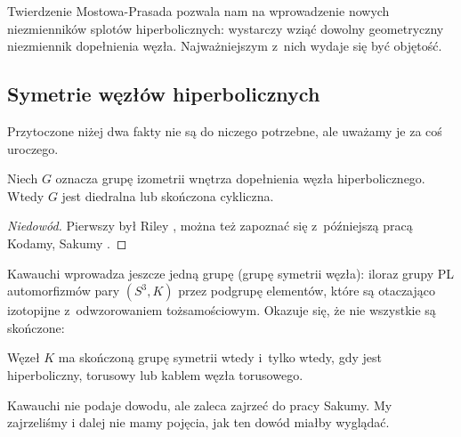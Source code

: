 Twierdzenie Mostowa-Prasada pozwala nam na wprowadzenie nowych niezmienników splotów hiperbolicznych: wystarczy wziąć dowolny geometryczny niezmiennik dopełnienia węzła.
Najważniejszym z~nich wydaje się być objętość.



\subsection{Symetrie węzłów hiperbolicznych}
Przytoczone niżej dwa fakty nie są do niczego potrzebne, ale uważamy je za coś uroczego.

\begin{proposition}
    Niech $G$ oznacza grupę izometrii wnętrza dopełnienia węzła hiperbolicznego.
    Wtedy $G$ jest diedralna lub skończona cykliczna.
\end{proposition}

\begin{proof}[Niedowód]
%
%
%
    Pierwszy był Riley \cite[s. 124]{riley1979}, można też zapoznać się z~późniejszą pracą  Kodamy, Sakumy \cite{kodama1992}.
\end{proof}

Kawauchi \cite[s. 131]{kawauchi1996} wprowadza jeszcze jedną grupę (grupę symetrii węzła): iloraz grupy PL automorfizmów pary $(S^3, K)$ przez podgrupę elementów, które są otaczająco izotopijne z~odwzorowaniem tożsamościowym.
Okazuje się, że nie wszystkie są skończone:

\begin{proposition}
    Węzeł $K$ ma skończoną grupę symetrii wtedy i~tylko wtedy, gdy jest hiperboliczny, torusowy lub kablem węzła torusowego.
\end{proposition}

Kawauchi nie podaje dowodu, ale zaleca zajrzeć do pracy Sakumy.
My zajrzeliśmy i dalej nie mamy pojęcia, jak ten dowód miałby wyglądać.



